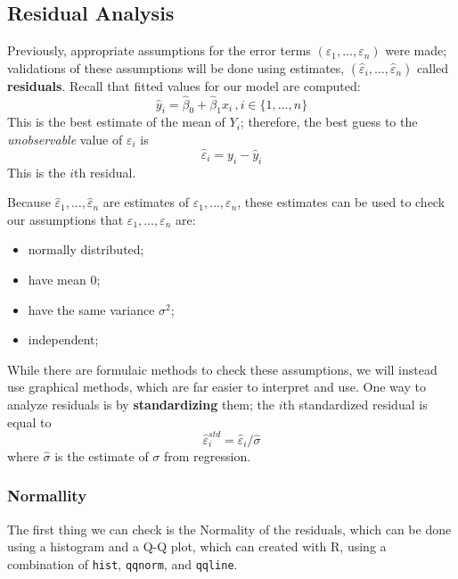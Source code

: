 \documentclass[12pt]{article}
\begin{document}
\subsection{Residual Analysis}

Previously, appropriate assumptions for the error terms $(\varepsilon_1, \dots, \varepsilon_n)$ were made; validations of these assumptions will be done using estimates, $(\hat{\varepsilon}_i, \dots, \hat{\varepsilon}_n)$ called \textbf{residuals}. Recall that fitted values for our model are computed: \[\hat{y}_i = \hat{\beta}_0 + \hat{\beta}_1x_i\, , i\in\{1,\dots, n\}\] This is the best estimate of the mean of $Y_i$; therefore, the best guess to the \textit{unobservable} value of $\varepsilon_i$ is \[\hat{\varepsilon}_i = y_i - \hat{y}_i\] This is the $i$th residual.

Because $\hat{\varepsilon}_1, \dots, \hat{\varepsilon}_n$ are estimates of $\varepsilon_1, \dots, \varepsilon_n$, these estimates can be used to check our assumptions that $\varepsilon_1, \dots, \varepsilon_n$ are: \begin{itemize}
    \item normally distributed;
    \item have mean 0;
    \item have the same variance $\sigma^2$;
    \item independent;
\end{itemize} While there are formulaic methods to check these assumptions, we will instead use graphical methods, which are far easier to interpret and use.
One way to analyze residuals is by \textbf{standardizing} them; the $i$th standardized residual is equal to \[\hat{\varepsilon}_i^{std} = \hat{\varepsilon}_i / \hat{\sigma}\] where $\hat{\sigma}$ is the estimate of $\sigma$ from regression. 

\subsubsection{Normallity}

The first thing we can check is the Normality of the residuals, which can be done using a histogram and a Q-Q plot, which can created with R, using a combination of \lstinline[language=R]{hist}, \lstinline[language=R]{qqnorm}, and \lstinline[language=R]{qqline}.
\end{document}
